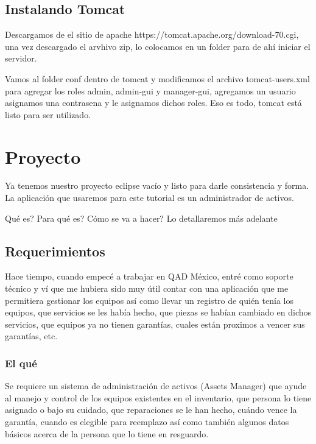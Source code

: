 \documentclass[12pt,a4paper]{article}
\begin{document}
		\subsection{Instalando Tomcat}
		Descargamos de el sitio de apache https://tomcat.apache.org/download-70.cgi, una vez descargado el arvhivo zip, lo colocamos en un folder para de ah\'i iniciar el servidor.\\ \par
		Vamos al folder conf dentro de tomcat y modificamos el archivo tomcat-users.xml para agregar los roles admin, admin-gui y manager-gui, agregamos un usuario asignamos una contrasena y le asignamos dichos roles. Eso es todo, tomcat est\'a listo para ser utilizado.\\ \par
		\newpage
		\section{Proyecto}
		Ya tenemos nuestro proyecto eclipse vac\'io y listo para darle consistencia y forma. La aplicaci\'on que usaremos para este tutorial es un administrador de activos.\\ \par
		Qu\'e es? Para qu\'e es? C\'omo se va a hacer? Lo detallaremos m\'as adelante\\ \par
		\subsection{Requerimientos}
		Hace tiempo, cuando empec\'e a trabajar en QAD M\'exico, entr\'e como soporte t\'ecnico y v\'i que me hubiera sido muy \'util contar con una aplicaci\'on que me permitiera gestionar los equipos as\'i como llevar un registro de qui\'en ten\'ia los equipos, que servicios se les hab\'ia hecho, que piezas se hab\'ian cambiado en dichos servicios, que equipos ya no tienen garant\'ias, cuales est\'an proximos a vencer sus garant\'ias, etc.
        \subsubsection{El qu\'e}
        Se requiere un sistema de administraci\'on de activos (Assets Manager) que ayude al manejo y control de los equipos existentes en el inventario, que persona lo tiene asignado o bajo su cuidado, que reparaciones se le han hecho, cu\'ando vence la garant\'ia, cuando es elegible para reemplazo as\'i como tambi\'en algunos datos b\'asicos acerca de la persona que lo tiene en resguardo.
		\newpage
\end{document}
